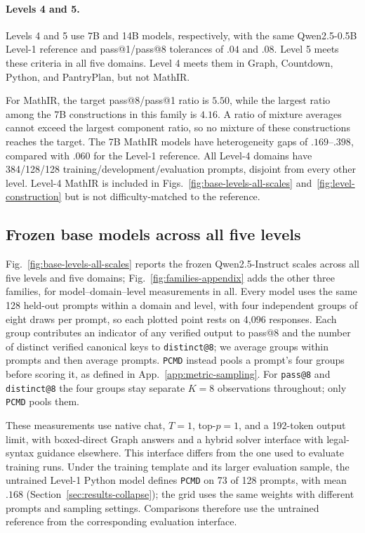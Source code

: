 \documentclass{article}
\makeatletter
\newcommand{\1}{\mathbf 1}
\newcommand{\pmd}{\texttt{PCMD}}
\newcommand{\distk}{\texttt{distinct@8}}
\theoremstyle{remark}
\theoremstyle{definition}
\theoremstyle{plain}
\makeatother
\begin{document}
\paragraph{Levels 4 and 5.}
Levels 4 and 5 use 7B and 14B models, respectively, with the same
Qwen2.5-0.5B Level-1 reference and pass@1/pass@8 tolerances of $.04$ and $.08$.
Level 5 meets these criteria in all five domains. Level 4 meets them in Graph,
Countdown, Python, and PantryPlan, but not MathIR.

For MathIR, the target pass@8/pass@1 ratio is $5.50$, while the largest ratio
among the 7B constructions in this family is $4.16$. A ratio of mixture
averages cannot exceed the largest component ratio, so no mixture of these
constructions reaches the target. The 7B MathIR models have heterogeneity
gaps of $.169$--$.398$, compared with $.060$ for the Level-1 reference. All
Level-4 domains have 384/128/128 training/development/evaluation prompts,
disjoint from every other level. Level-4 MathIR is included in
Figs.~\ref{fig:base-levels-all-scales} and~\ref{fig:level-construction}
but is not difficulty-matched to the reference.

\subsection{Frozen base models across all five levels}
\label{app:base-levels-all-scales}

Fig.~\ref{fig:base-levels-all-scales} reports the frozen Qwen2.5-Instruct
scales across all five levels and five domains;
Fig.~\ref{fig:families-appendix} adds the other three families, for
\MDcells{} model--domain--level measurements in all. Every model uses the same 128 held-out
prompts within a domain and level, with four independent groups of eight draws
per prompt, so each plotted point rests on 4,096 responses. Each group contributes an indicator
of any verified output to pass@8 and the number of distinct verified canonical
keys to \distk{}; we average groups within prompts and then
average prompts. \pmd{} instead pools a prompt's four groups before scoring it,
as defined in App.~\ref{app:metric-sampling}.
For \texttt{pass@8} and \distk{} the four groups stay separate $K=8$
observations throughout; only \pmd{} pools them.

These measurements use native chat, $T=1$, top-$p=1$, and a 192-token output
limit, with boxed-direct Graph answers and a hybrid solver interface with
legal-syntax guidance elsewhere. This interface differs from the one used to
evaluate training runs. Under the training template and its larger evaluation
sample, the untrained Level-1 Python model defines \pmd{} on 73 of 128 prompts,
with mean $.168$ (Section~\ref{sec:results-collapse}); the grid uses the same
weights with different prompts and sampling settings. Comparisons therefore
use the untrained reference from the corresponding evaluation interface.
\end{document}
